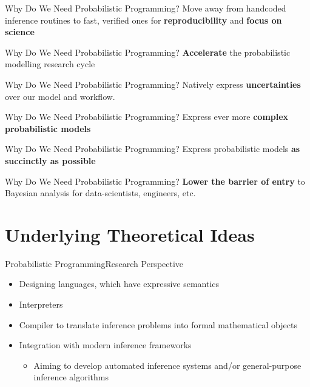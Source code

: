 \documentclass[AERbeamer%
              ,optEnglish%
              ,optBiber%
              ,optBibstyleAlphabetic%
              ,optBeamerClassicFormat%
              ]{AERlatex}%
\begin{document}
\begin{frame}[c]{Why Do We Need Probabilistic Programming?}
    \centering
    \LARGE{Move away from handcoded inference routines to fast, verified ones for \textbf{reproducibility} and \textbf{focus on science}}
\end{frame}


\begin{frame}[c]{Why Do We Need Probabilistic Programming?}
    \centering
    \LARGE{\textbf{Accelerate} the probabilistic modelling research cycle}
\end{frame}


\begin{frame}[c]{Why Do We Need Probabilistic Programming?}
    \centering
    \LARGE{Natively express \textbf{uncertainties} over our model and workflow.}
\end{frame}


\begin{frame}[c]{Why Do We Need Probabilistic Programming?}
    \centering
    \LARGE{Express ever more \textbf{complex probabilistic models}}
\end{frame}


\begin{frame}[c]{Why Do We Need Probabilistic Programming?}
    \centering
    \LARGE{Express probabilistic models \textbf{as succinctly as possible}}
\end{frame}


\begin{frame}[c]{Why Do We Need Probabilistic Programming?}
    \centering
    \LARGE{\textbf{Lower the barrier of entry} to Bayesian analysis for data-scientists, engineers, etc.}
\end{frame}



\section{Underlying Theoretical Ideas}


\begin{frame}[c]{Probabilistic Programming}{Research Perspective}
    \centering
    \begin{itemize}
        \item Designing languages, which have expressive semantics
        \item Interpreters
        \item Compiler to translate inference problems into formal mathematical objects
        \item Integration with modern inference frameworks
        \begin{itemize}
            \item Aiming to develop automated inference systems and/or general-purpose
                  inference algorithms
        \end{itemize}
    \end{itemize}
\end{frame}
\end{document}
